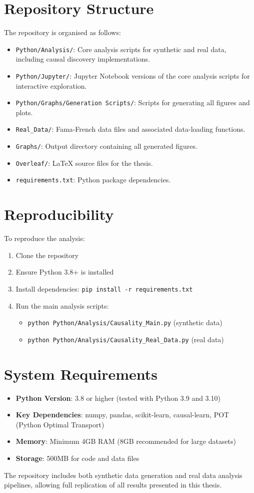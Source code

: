 \section*{Repository Structure}
The repository is organised as follows:
\begin{itemize}
    \item \texttt{Python/Analysis/}: Core analysis scripts for synthetic and real data, including causal discovery implementations.
    \item \texttt{Python/Jupyter/}: Jupyter Notebook versions of the core analysis scripts for interactive exploration.
    \item \texttt{Python/Graphs/Generation Scripts/}: Scripts for generating all figures and plots.
    \item \texttt{Real\_Data/}: Fama-French data files and associated data-loading functions.
    \item \texttt{Graphs/}: Output directory containing all generated figures.
    \item \texttt{Overleaf/}: LaTeX source files for the thesis.
    \item \texttt{requirements.txt}: Python package dependencies.
\end{itemize}

\section*{Reproducibility}
To reproduce the analysis:
\begin{enumerate}
    \item Clone the repository
    \item Ensure Python 3.8+ is installed
    \item Install dependencies: \texttt{pip install -r requirements.txt}
    \item Run the main analysis scripts:
    \begin{itemize}
        \item \texttt{python Python/Analysis/Causality\_Main.py} (synthetic data)
        \item \texttt{python Python/Analysis/Causality\_Real\_Data.py} (real data)
    \end{itemize}
\end{enumerate}

\section*{System Requirements}
\begin{itemize}
    \item \textbf{Python Version}: 3.8 or higher (tested with Python 3.9 and 3.10)
    \item \textbf{Key Dependencies}: numpy, pandas, scikit-learn, causal-learn, POT (Python Optimal Transport)
    \item \textbf{Memory}: Minimum 4GB RAM (8GB recommended for large datasets)
    \item \textbf{Storage}: 500MB for code and data files
\end{itemize}

The repository includes both synthetic data generation and real data analysis pipelines, allowing full replication of all results presented in this thesis.